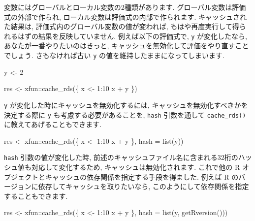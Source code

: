 \documentclass[
  11pt,
  lualatex,
  ja=standard]{bxjsreport}
\newenvironment{Shaded}{\begin{snugshade}}{\end{snugshade}}
\newcommand{\AttributeTok}[1]{\textcolor[rgb]{0.77,0.63,0.00}{#1}}
\newcommand{\DecValTok}[1]{\textcolor[rgb]{0.00,0.00,0.81}{#1}}
\newcommand{\FunctionTok}[1]{\textcolor[rgb]{0.00,0.00,0.00}{#1}}
\newcommand{\NormalTok}[1]{#1}
\newcommand{\OtherTok}[1]{\textcolor[rgb]{0.56,0.35,0.01}{#1}}
\newcommand{\SpecialCharTok}[1]{\textcolor[rgb]{0.00,0.00,0.00}{#1}}
\begin{document}
変数にはグローバルとローカル変数の2種類があります. グローバル変数は評価式の外部で作られ, ローカル変数は評価式の内部で作られます. キャッシュされた結果は, 評価式内のグローバル変数の値が変われば, もはや再度実行して得られるはずの結果を反映していません. 例えば以下の評価式で, \texttt{y} が変化したなら, あなたが一番やりたいのはきっと, キャッシュを無効化して評価をやり直すことでしょう. さもなければ古い \texttt{y} の値を維持したままになってしまいます.

\begin{Shaded}
\begin{Highlighting}[]
\NormalTok{y }\OtherTok{\textless{}{-}} \DecValTok{2}

\NormalTok{res }\OtherTok{\textless{}{-}}\NormalTok{ xfun}\SpecialCharTok{::}\FunctionTok{cache\_rds}\NormalTok{(\{}
\NormalTok{  x }\OtherTok{\textless{}{-}} \DecValTok{1}\SpecialCharTok{:}\DecValTok{10}
\NormalTok{  x }\SpecialCharTok{+}\NormalTok{ y}
\NormalTok{\})}
\end{Highlighting}
\end{Shaded}

\texttt{y} が変化した時にキャッシュを無効化するには, キャッシュを無効化すべきかを決定する際に \texttt{y} も考慮する必要があることを, \texttt{hash} 引数を通して \texttt{cache\_rds()} に教えてあげることもできます.

\begin{Shaded}
\begin{Highlighting}[]
\NormalTok{res }\OtherTok{\textless{}{-}}\NormalTok{ xfun}\SpecialCharTok{::}\FunctionTok{cache\_rds}\NormalTok{(\{}
\NormalTok{  x }\OtherTok{\textless{}{-}} \DecValTok{1}\SpecialCharTok{:}\DecValTok{10}
\NormalTok{  x }\SpecialCharTok{+}\NormalTok{ y}
\NormalTok{\}, }\AttributeTok{hash =} \FunctionTok{list}\NormalTok{(y))}
\end{Highlighting}
\end{Shaded}

\texttt{hash} 引数の値が変化した時, 前述のキャッシュファイル名に含まれる32桁のハッシュ値も対応して変化するため, キャッシュは無効化されます. これで他の R オブジェクトとキャッシュの依存関係を指定する手段を得ました. 例えば R のバージョンに依存してキャッシュを取りたいなら, このようにして依存関係を指定することもできます.

\begin{Shaded}
\begin{Highlighting}[]
\NormalTok{res }\OtherTok{\textless{}{-}}\NormalTok{ xfun}\SpecialCharTok{::}\FunctionTok{cache\_rds}\NormalTok{(\{}
\NormalTok{  x }\OtherTok{\textless{}{-}} \DecValTok{1}\SpecialCharTok{:}\DecValTok{10}
\NormalTok{  x }\SpecialCharTok{+}\NormalTok{ y}
\NormalTok{\}, }\AttributeTok{hash =} \FunctionTok{list}\NormalTok{(y, }\FunctionTok{getRversion}\NormalTok{()))}
\end{Highlighting}
\end{Shaded}
\end{document}
